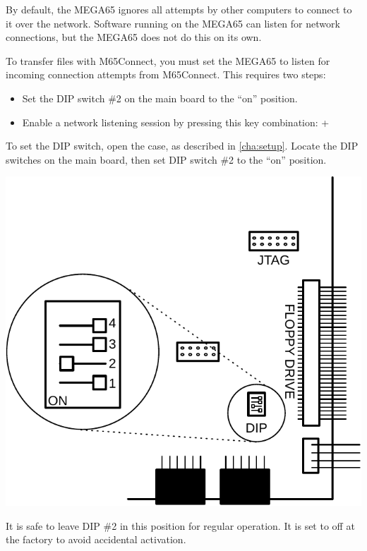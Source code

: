 By default, the MEGA65 ignores all attempts by other computers to connect to it over the network. Software running on the MEGA65 can listen for network connections, but the MEGA65 does not do this on its own.

To transfer files with M65Connect, you must set the MEGA65 to listen for incoming connection attempts from M65Connect. This requires two steps:

\begin{itemize}
\item Set the DIP switch \#2 on the main board to the ``on'' position.
\item Enable a network listening session by pressing this key combination:  + \megakey{\pounds}
\end{itemize}

To set the DIP switch, open the case, as described in \vref{cha:setup}. Locate the DIP switches on the main board, then set DIP switch \#2 to the ``on'' position.

\begin{center}
\includegraphics[width=\linewidth]{images/illustrations/mega65-dip2.pdf}
\end{center}

It is safe to leave DIP \#2 in this position for regular operation. It is set to off at the factory to avoid accidental activation.

